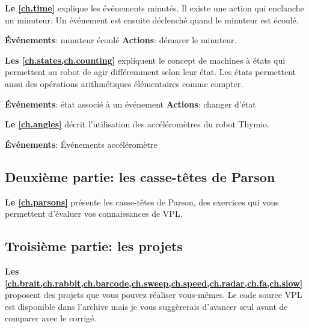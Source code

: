  \quad {} \hfill {}
\quad {} \quad {}

\medskip


\medskip

\textbf{Le \cref{ch.time}} explique les événements minutés.
Il existe une action qui enclanche un minuteur.
Un événement est ensuite déclenché quand le minuteur est écoulé.

\textbf{Événements}: minuteur écoulé\hfill
\textbf{Actions}: démarer le minuteur.

 \hfill {}

\newpage

\textbf{Les \cref{ch.states,ch.counting}} expliquent le concept de machines à états qui permettent au robot de agir différemment selon leur état.
Les états permettent aussi des opérations arithmétiques élémentaires comme compter.

\textbf{Événements}: état associé à un événement\hfill
\textbf{Actions}: changer d'état

 \hfill {}

\medskip

\textbf{Le \cref{ch.angles}} décrit l'utilisation des accéléromètres du robot Thymio.

\textbf{Événements}: Événements accéléromètre

 \quad {}

\bigskip

\subsection*{Deuxième partie: les casse-têtes de Parson}

\textbf{Le \cref{ch.parsons}} présente les casse-têtes de Parson, des exercices qui vous permettent d'évaluer vos connaissances de VPL.

\bigskip

\subsection*{Troisième partie: les projets}
\textbf{Les \cref{ch.brait,ch.rabbit,ch.barcode,ch.sweep,ch.speed,ch.radar,ch.fa,ch.slow}} proposent des projets que vous pouvez réaliser vous-mêmes.
Le code source VPL est disponible dans l'archive mais je vous suggèrerais d'avancer seul avant de comparer avec le corrigé.


